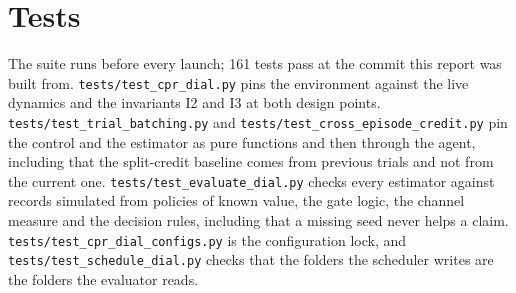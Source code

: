 \section{Tests}
\label{sec:impl-tests}

The suite runs before every launch; 161 tests pass at the commit this report
was built from.
\texttt{tests/test\_cpr\_dial.py} pins the environment against the live
dynamics and the invariants I2 and I3 at both design points.
\texttt{tests/test\_trial\_batching.py} and
\texttt{tests/test\_cross\_episode\_credit.py} pin the control and the
estimator as pure functions and then through the agent, including that the
split-credit baseline comes from previous trials and not from the current
one.
\texttt{tests/test\_evaluate\_dial.py} checks every estimator against
records simulated from policies of known value, the gate logic, the channel
measure and the decision rules, including that a missing seed never helps a
claim.
\texttt{tests/test\_cpr\_dial\_configs.py} is the configuration lock, and
\texttt{tests/test\_schedule\_dial.py} checks that the folders the scheduler
writes are the folders the evaluator reads.
